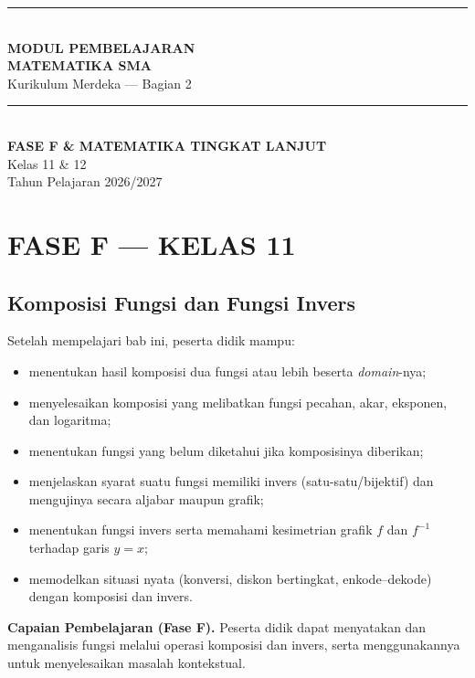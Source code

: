 \documentclass[11pt,a4paper]{report}
\theoremstyle{gaya}
\begin{document}
\begin{titlepage}
\centering
\vspace*{2cm}
{\color{biru}\rule{\textwidth}{2pt}}\\[0.6cm]
{\Huge\bfseries\color{biru} MODUL PEMBELAJARAN\\[0.3cm] MATEMATIKA SMA}\\[0.4cm]
{\Large Kurikulum Merdeka — Bagian 2}\\[0.2cm]
{\color{biru}\rule{\textwidth}{2pt}}\\[1.2cm]

{\LARGE\bfseries FASE F \& MATEMATIKA TINGKAT LANJUT}\\[0.3cm]
{\Large Kelas 11 \& 12}\\[2cm]

\vfill
{\large Tahun Pelajaran 2026/2027}
\end{titlepage}

\tableofcontents
\thispagestyle{empty}
\clearpage

\part*{\centering FASE F --- KELAS 11}

\chapter{Komposisi Fungsi dan Fungsi Invers}
\begin{tujuan}
Setelah mempelajari bab ini, peserta didik mampu:
\begin{itemize}[leftmargin=*,topsep=2pt]
  \item menentukan hasil komposisi dua fungsi atau lebih beserta \emph{domain}-nya;
  \item menyelesaikan komposisi yang melibatkan fungsi pecahan, akar, eksponen, dan logaritma;
  \item menentukan fungsi yang belum diketahui jika komposisinya diberikan;
  \item menjelaskan syarat suatu fungsi memiliki invers (satu-satu/bijektif) dan mengujinya secara aljabar maupun grafik;
  \item menentukan fungsi invers serta memahami kesimetrian grafik $f$ dan $f^{-1}$ terhadap garis $y=x$;
  \item memodelkan situasi nyata (konversi, diskon bertingkat, enkode--dekode) dengan komposisi dan invers.
\end{itemize}
\textbf{Capaian Pembelajaran (Fase F).} Peserta didik dapat menyatakan dan menganalisis fungsi melalui operasi komposisi dan invers, serta menggunakannya untuk menyelesaikan masalah kontekstual.
\end{tujuan}
\end{document}
